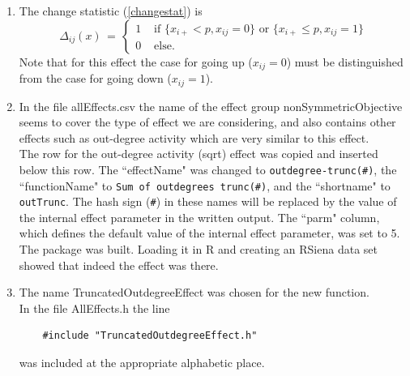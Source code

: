\documentclass[a4paper,fleqn,11pt]{article}
\newcommand{\+}{\, + \,}
\newcommand{\sfn}[1]{\textsf{#1}}
\newcommand{\R}{{\sf R }}
\newcommand{\RS}{{\sf RSiena }}
\begin{document}
\begin{enumerate}
\item The change statistic (\ref{changestat}) is
      \begin{equation}
       \Delta_{ij}(x) \,=\, \left\{ \begin{array}{ll}
                   1 & \text{  if } \{x_{i+} < p,  x_{ij} = 0 \}
                     \text{ or } \{x_{i+} \leq p,  x_{ij} = 1 \} \\
                   0 & \text{  else. }
                   \end{array}         \right.  \label{outTrunc_cs}
      \end{equation}
      Note that for this effect the case for going up ($x_{ij} = 0$)
      must be distinguished from the case
      for going down ($x_{ij} = 1$).
\item In the file \textsf{allEffects.csv} the name of the
      effect group \textsf{nonSymmetricObjective} seems to cover the
      type of effect we are considering, and also contains other effects
      such as out-degree activity which are very similar to this
      effect.\\
      The row for the out-degree activity (sqrt) effect was copied
      and inserted below this row. The ``effectName" was changed to
      \texttt{outdegree-trunc(\#)}, the ``functionName" to
      \texttt{Sum of outdegrees trunc(\#)},
      and the ``shortname" to \texttt{outTrunc}.
      The hash sign (\texttt{\#}) in these names will be replaced
      by the value of the
      internal effect parameter in the written output.
      The ``parm" column, which defines
      the default value of the internal effect parameter, was set to 5.
      \\
      The package was built. Loading it in \R and creating an
      \RS data set showed that indeed the effect was there.
\item The name \sfn{TruncatedOutdegreeEffect} was chosen for the new function.\\
      In the file \textsf{AllEffects.h} the line
      \begin{verbatim}
    #include "TruncatedOutdegreeEffect.h"
      \end{verbatim}
      was included at the appropriate alphabetic place.


\end{enumerate}
\end{document}
